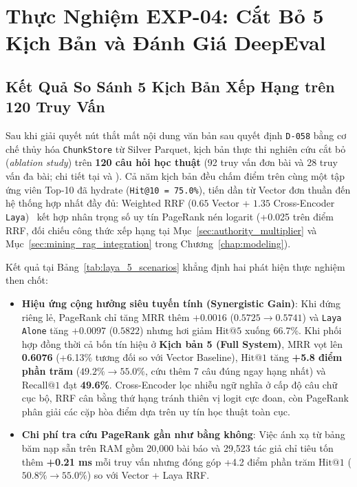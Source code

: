 \section{Thực Nghiệm EXP-04: Cắt Bỏ 5 Kịch Bản và Đánh Giá DeepEval}
\label{sec:ch5_exp04}

\subsection{Kết Quả So Sánh 5 Kịch Bản Xếp Hạng trên 120 Truy Vấn}
\label{sec:ch5_5scenarios}

Sau khi giải quyết nút thắt mất nội dung văn bản sau quyết định \texttt{D-058} bằng cơ chế thủy hóa \texttt{ChunkStore} từ Silver Parquet, kịch bản  thực thi nghiên cứu cắt bỏ (\textit{ablation study}) trên \textbf{120 câu hỏi học thuật} (92 truy vấn đơn bài và 28 truy vấn đa bài; chi tiết tại  và ). Cả năm kịch bản đều chấm điểm trên cùng một tập ứng viên Top-10 đã hydrate (\texttt{Hit@10 = 75.0\%}), tiến dần từ Vector đơn thuần đến hệ thống hợp nhất đầy đủ: Weighted RRF ($0.65$ Vector + $1.35$ Cross-Encoder \texttt{Laya})~\cite{cormack2009reciprocal} kết hợp nhân trọng số uy tín PageRank nén logarit (+0.025 trên điểm RRF, đối chiếu công thức xếp hạng tại Mục~\ref{sec:authority_multiplier} và Mục~\ref{sec:mining_rag_integration} trong Chương~\ref{chap:modeling}).



Kết quả tại Bảng~\ref{tab:laya_5_scenarios} khẳng định hai phát hiện thực nghiệm then chốt:
\begin{itemize}
  \item \textbf{Hiệu ứng cộng hưởng siêu tuyến tính (Synergistic Gain)}: Khi đứng riêng lẻ, PageRank chỉ tăng $\mathrm{MRR}$ thêm $+0.0016$ ($0.5725 \rightarrow 0.5741$) và \texttt{Laya Alone} tăng $+0.0097$ ($0.5822$) nhưng hơi giảm $\mathrm{Hit}@5$ xuống 66.7\%. Khi phối hợp đồng thời cả bốn tín hiệu ở \textbf{Kịch bản 5 (Full System)}, $\mathrm{MRR}$ vọt lên \textbf{0.6076} (+6.13\% tương đối so với Vector Baseline), $\mathrm{Hit}@1$ tăng \textbf{+5.8 điểm phần trăm} ($49.2\% \rightarrow 55.0\%$, cứu thêm 7 câu đúng ngay hạng nhất) và $\mathrm{Recall}@1$ đạt \textbf{49.6\%}. Cross-Encoder lọc nhiễu ngữ nghĩa ở cấp độ câu chữ cục bộ, RRF cân bằng thứ hạng tránh thiên vị logit cực đoan, còn PageRank phân giải các cặp hòa điểm dựa trên uy tín học thuật toàn cục.
  \item \textbf{Chi phí tra cứu PageRank gần như bằng không}: Việc ánh xạ từ bảng băm nạp sẵn trên RAM gồm 20,000 bài báo và 29,523 tác giả chỉ tiêu tốn thêm \textbf{+0.21 ms} mỗi truy vấn nhưng đóng góp +4.2 điểm phần trăm $\mathrm{Hit}@1$ ($50.8\% \rightarrow 55.0\%$) so với Vector + Laya RRF.
\end{itemize}

